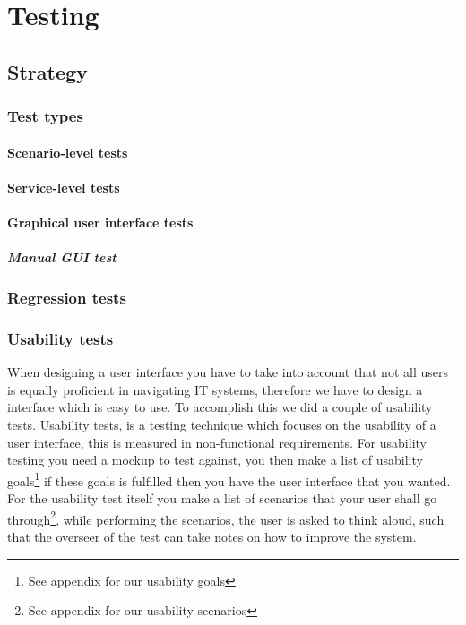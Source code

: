 \chapter{Testing}
\label{Testing}

\section{Strategy}
\label{Testing_Strategy}

\subsection{Test types}
\label{Testing_Strategy_Types}

\subsubsection{Scenario-level tests}
\label{Testing_Strategy_Types_Scenario}

\subsubsection{Service-level tests}
\label{Testing_Strategy_Types_Service}

\subsubsection{Graphical user interface tests}
\label{Testing_Strategy_Types_EndUser}

\paragraph{Manual GUI test}

\subsection{Regression tests}
\label{Testing_Strategy_Regression}

\subsection{Usability tests}
\label{Testing_Strategy_Usability}
When designing a user interface you have to take into account that not all users is equally proficient in navigating IT systems, therefore we have to design a interface which is easy to use. To accomplish this we did a couple of usability tests. Usability tests, is a testing technique which focuses on the usability of a user interface, this is measured in non-functional requirements. For usability testing you need a mockup to test against, you then make a list of usability goals\footnote{See appendix for our usability goals} if these goals is fulfilled then you have the user interface that you wanted. For the usability test itself you make a list of scenarios that your user shall go through\footnote{See appendix for our usability scenarios}, while performing the scenarios, the user is asked to think aloud, such that the overseer of the test can take notes on how to improve the system.


